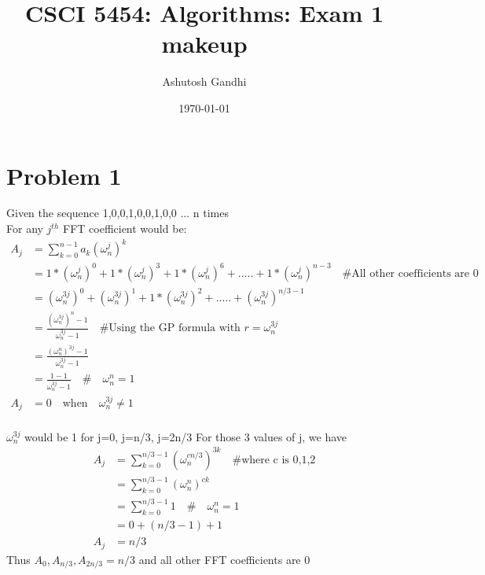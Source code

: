 \documentclass[12pt]{article}
\title{CSCI 5454: Algorithms: Exam 1 makeup}
\author{Ashutosh Gandhi}
\date{\today}
\begin{document}
\maketitle

\section*{Problem 1}


\vspace{10pt}



Given the sequence 1,0,0,1,0,0,1,0,0 ... n times \\
For any $j^{th}$ FFT coefficient would be: 
\begin{equation}
\begin{aligned}
\nonumber
A_j&=\sum_{k=0}^{n-1} a_k (\omega_n^{j})^k \\
&=1*(\omega_n^{j})^0 + 1*(\omega_n^{j})^3 + 1*(\omega_n^{j})^6 + ..... + 1*(\omega_n^{j})^{n-3} \quad \text{\# All other coefficients are 0} \\
&=(\omega_n^{3j})^0 + (\omega_n^{3j})^1 + 1*(\omega_n^{3j})^2 + ..... + (\omega_n^{3j})^{n/3-1} \\
&= \frac{(\omega_n^{3j})^n - 1}{\omega_n^{3j} - 1}  \quad \text{\# Using the GP formula with }
r=\omega_n^{3j} \\
&= \frac{(\omega_n^{n})^{3j} - 1}{\omega_n^{3j} - 1} \\
&= \frac{1-1}{\omega_n^{3j} - 1} \quad \# \quad \omega_n^n=1 \\
A_j&= 0 \quad \text{when} \quad \omega_n^{3j} \neq 1 \\
\end{aligned}
\end{equation}

$\omega_n^{3j}$ would be 1 for j=0, j=n/3, j=2n/3
For those 3 values of j, we have 
\begin{equation}
\begin{aligned}
\nonumber
A_j&=\sum_{k=0}^{n/3-1} (\omega_n^{cn/3})^{3k} \quad \text{\# where c is 0,1,2} \\
&=\sum_{k=0}^{n/3-1} (\omega_n^{n})^{ck} \\
&=\sum_{k=0}^{n/3-1} 1 \quad \# \quad \omega_n^n=1 \\
&= 0 + (n/3 - 1) + 1 \\
A_j&=n/3
\end{aligned}
\end{equation}
Thus $A_0, A_{n/3}, A_{2n/3}=n/3$ and all other FFT coefficients are 0
\end{document}
